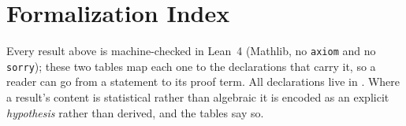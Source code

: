 \begin{itemize}[leftmargin=*,itemsep=2pt]
\end{itemize}

\section{Formalization Index}
\label{app:lean}

Every result above is machine-checked in Lean~4 (Mathlib, no \texttt{axiom} and no \texttt{sorry}); these two tables map each one to the declarations that carry it, so a reader can go from a statement to its proof term. All declarations live in . Where a result's content is statistical rather than algebraic it is encoded as an explicit \emph{hypothesis} rather than derived, and the tables say so.

